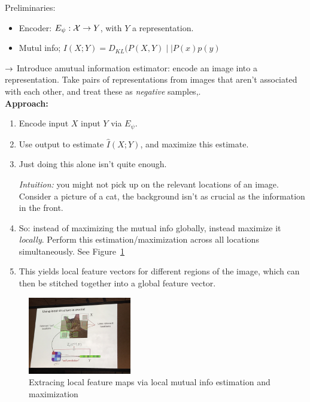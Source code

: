 Preliminaries:
\begin{itemize}
    \item Encoder: $E_\psi : \mathcal{X} \rightarrow Y$, with $Y$ a representation.
    
    \item Mutul info; $I(X;Y) = D_{KL}(P(X,Y) \mid \mid P(x) p(y)$
\end{itemize}

$\rightarrow$ Introduce amutual information estimator: encode an image into a representation. Take pairs of representations from images that aren't associated with each other, and treat these as {\it negative} samples,. \\

{\bf Approach:} 
\begin{enumerate}
    \item Encode input $X$ input $Y$ via $E_\psi$.
    \item Use output to estimate $\hat{I}(X;Y)$, and maximize this estimate.
    \item Just doing this alone isn't quite enough.
    
    {\it Intuition:} you might not pick up on the relevant locations of an image. Consider a picture of a cat, the background isn't as crucial as the information in the front.
    
    \item So: instead of maximizing the mutual info globally, instead maximize it {\it locally}. Perform this estimation/maximization across all locations simultaneously. See Figure~\ref{fig:cat}
    \item This yields local feature vectors for different regions of the image, which can then be stitched together into a global feature vector.
\end{enumerate}

\begin{figure}
    \centering
    \includegraphics[width=0.4\textwidth]{images/cat.JPG}
    \caption{Extracing local feature maps via local mutual info estimation and maximization}
    \label{fig:cat}
\end{figure}

